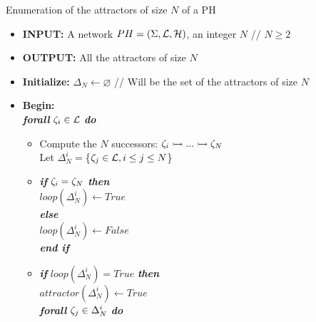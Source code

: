 \begin{algorithm}[p]
	\caption{Enumeration of the attractors of size $N$ of a PH}
	\label{alg:PH-attractor}
	\begin{itemize}
		\item[] \textbf{INPUT:} A network $PH=(\Sigma,\mathcal{L},\mathcal{H})$, an integer $N$ \quad // $N \geq 2$
		\item[] \textbf{OUTPUT:} All the attractors of size $N$
		\item[] \textbf{Initialize:} $\Delta_N \longleftarrow \varnothing$ \quad // Will be the set of the attractors of size $N$
		\item[] \textbf{Begin:} \\
		
			\hspace{0.2cm}	\textbf{\textit{forall}} $\zeta_i \in \mathcal{L}$ \textbf{\textit{do}} 
				
				\begin{itemize}
					\item[] Compute the $N$ successors: $\zeta_i \rightarrowtail ... \rightarrowtail \zeta_N$ \\ Let $\Delta_N^i=$\{$\zeta_j \in \mathcal{L}, i \leq j \leq N$\} %
					
					\item[] \textbf{\textit{if}} $\zeta_i = \zeta_N$ \textbf{\textit{then}} \\
						\hspace{0.7cm}  $loop(\Delta_N^i) \longleftarrow True$ \\
					 \textbf{\textit{else}} \\
					 	\hspace{0.7cm}  $loop(\Delta_N^i) \longleftarrow False$ \\
					 \textbf{\textit{end if}} 
					 
					\item[] \textbf{\textit{if}} $loop(\Delta_N^i) = True$ \textbf{\textit{then}} \\
					
							\hspace{0.7cm} $attractor(\Delta_N^i) \longleftarrow True$	\\
							
							\hspace{0.7cm} \textbf{\textit{forall}} $\zeta_j \in \Delta_N^i$ \textbf{\textit{do}} \\
							

\end{itemize}
\end{itemize}
\end{algorithm}
